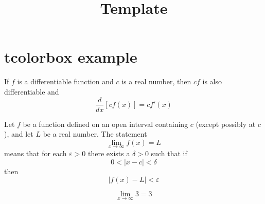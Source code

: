 



\title{Template}
\author{}
\date{}


\maketitle

\newpage

\section{tcolorbox example}

\begin{theorembox}[Theorem 2.4]
If \(f\) is a differentiable function and \(c\) is a real number, then \(cf\) is also differentiable and
\[
\frac{d}{dx}\left[ cf(x) \right] = cf'(x)
\]
\end{theorembox}

\bigskip

\begin{definitionbox}
Let \(f\) be a function defined on an open interval containing \(c\) (except possibly at \(c\)), and let \(L\) be a real number. The statement
\[
\lim_{x\to\infty} f(x) = L
\]
means that for each \(\varepsilon > 0\) there exists a \(\delta > 0\) such that if
\[
0 < \left| x-c \right| < \delta
\]
then
\[
\left| f(x) - L \right| < \varepsilon
\]
\end{definitionbox}

\bigskip


\begin{examplebox}
\[
\lim_{x\to\infty} 3 = 3
\]
\end{examplebox}



